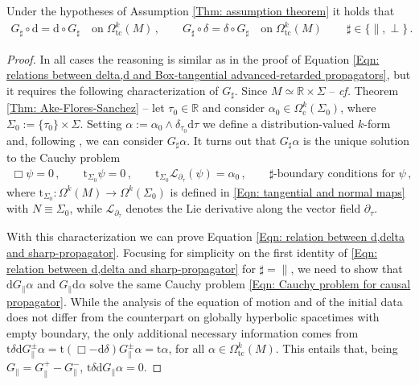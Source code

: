 \begin{corollary}\label{Cor: G commutes with d, delta}
	Under the hypotheses of Assumption \ref{Thm: assumption theorem} it holds that 
	\begin{align}\label{Eqn: relation between d,delta and sharp-propagator}
	G_\sharp\circ \mathrm{d}=\mathrm{d}\circ G_\sharp\quad \mathrm{on}\;\Omega^k_{\mathrm{tc}}(M)\,,\qquad
	G_\sharp\circ \delta=\delta\circ G_\sharp\quad \mathrm{on}\;\Omega^k_{\mathrm{tc}}(M)\,\qquad
	\sharp\in\lbrace\parallel,\perp\rbrace\,.
	\end{align}
\end{corollary}

\begin{proof}
	In all cases the reasoning is similar as in the proof of Equation \eqref{Eqn: relations between delta,d and Box-tangential advanced-retarded propagators}, but it requires the following characterization of $G_\sharp$.
	Since $M\simeq\mathbb{R}\times\Sigma$ -- \textit{cf.} Theorem \ref{Thm: Ake-Flores-Sanchez} -- let $\tau_0\in\mathbb{R}$ and consider $\alpha_0\in\Omega_{\mathrm{c}}^k(\Sigma_0)$, where $\Sigma_0:=\lbrace \tau_0\rbrace\times \Sigma$.
	Setting $\alpha:=\alpha_0\wedge\delta_{\tau_0}\mathrm{d}\tau$ we define a distribution-valued $k$-form and, following \cite[Lem. 4.1., Thm. 4.3]{Baer-15}, we can consider $G_\sharp\alpha$.
	It turns out that $G_\sharp\alpha$ is the unique solution to the Cauchy problem
	\begin{align}\label{Eqn: Cauchy problem for causal propagator}
	\Box\psi=0\,,\qquad
	\mathrm{t}_{\Sigma_0}\psi=0\,,\qquad
	\mathrm{t}_{\Sigma_0}\mathcal{L}_{\partial_\tau}(\psi)=\alpha_0\,,\qquad
	\sharp\textrm{-boundary conditions for }\psi\,,
	\end{align}
	where $\mathrm{t}_{\Sigma_0}\colon\Omega^k(M)\to\Omega^k(\Sigma_0)$ is defined in \eqref{Eqn: tangential and normal maps} with $N\equiv\Sigma_0$, while $\mathcal{L}_{\partial_\tau}$ denotes the Lie derivative along the vector field $\partial_\tau$.
	
	With this characterization we can prove Equation \eqref{Eqn: relation between d,delta and sharp-propagator}.
	Focusing for simplicity on the first identity of \eqref{Eqn: relation between d,delta and sharp-propagator} for $\sharp=\parallel$, we need to show that $\mathrm{d}G_{\parallel}\alpha$ and $G_{\parallel}\mathrm{d}\alpha$ solve the same Cauchy problem \eqref{Eqn: Cauchy problem for causal propagator}.
	While the analysis of the equation of motion and of the initial data does not differ from the counterpart on globally hyperbolic spacetimes with empty boundary,
	the only additional necessary information comes from $\mathrm{t}\delta\mathrm{d} G^\pm_{\parallel}\alpha=\mathrm{t}(\Box-\mathrm{d}\delta)G^\pm_{\parallel}\alpha=\mathrm{t}\alpha$, for all $\alpha\in\Omega^k_{\mathrm{tc}}(M)$.
	This entails that, being $G_{\parallel}=G^+_{\parallel}-G^-_{\parallel}$, $\mathrm{t}\delta \mathrm{d} G_{\parallel}\alpha=0$.
\end{proof}



